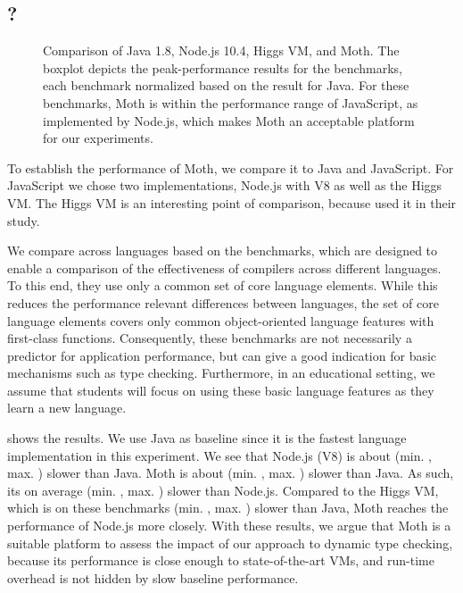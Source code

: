 \subsection{\AWFY?}
\label{sec:baseline-perf}


\begin{figure}
	\AwfyBaseline{}
	\caption{Comparison of Java 1.8, Node.js 10.4, Higgs VM, and Moth.
  The boxplot depicts the peak-performance results for the \AWFY benchmarks,
  each benchmark normalized based on the result for Java.
  For these benchmarks, Moth is within the performance range
  of JavaScript, as implemented by Node.js,
  which makes Moth an acceptable platform for our experiments.}
	\label{fig:awfy-baseline}
\end{figure}

To establish the performance of Moth,
we compare it to Java and JavaScript.
For JavaScript we chose two implementations,
Node.js with V8 as well as the Higgs VM.
The Higgs VM is an interesting point of comparison,
because \citet{Richards2017} used it in their study.

We compare across languages based on the \AWFY benchmarks\citep{Marr2016},
which are designed to enable a comparison
of the effectiveness of compilers across different languages.
To this end, they use only a common set of core language elements.
While this reduces the performance relevant differences between languages,
the set of core language elements covers only common object-oriented language
features with first-class functions.
Consequently, these benchmarks are not necessarily a predictor
for application performance,
but can give a good indication for basic mechanisms such as type checking.
Furthermore, in an educational setting,
we assume that students will focus on using these basic language features
as they learn a new language.

 shows the results.
We use Java as baseline since it is the fastest language implementation
in this experiment.
We see that Node.js (V8) is about
\OverheadNodeGMeanX (min. \OverheadNodeMinX, max. \OverheadNodeMaxX)
slower than Java.
Moth is about \OverheadMothGMeanX (min. \OverheadMothMinX, max. \OverheadMothMaxX) slower than Java.
As such, its on average \OverheadMothNodeGMeanP (min. \OverheadMothNodeMinP, max. \OverheadMothNodeMaxX) slower than Node.js.
Compared to the Higgs VM, which is on these benchmarks
\OverheadHiggsGMeanX (min. \OverheadHiggsMinX, max. \OverheadHiggsMaxX) slower than Java,
Moth reaches the performance of Node.js more closely.
With these results, we argue that Moth is a suitable platform to
assess the impact of our approach to dynamic type checking,
because its performance is close enough to state-of-the-art VMs,
and run-time overhead is not hidden by slow baseline performance.


